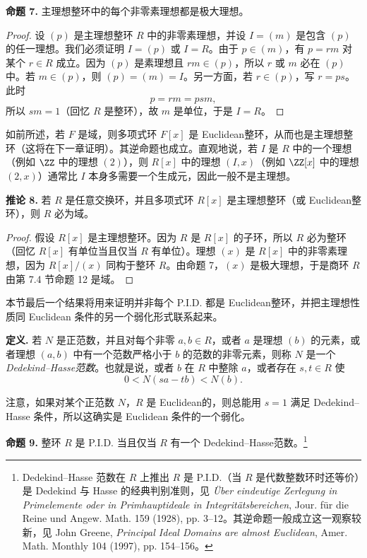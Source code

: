 \medskip
\noindent\textbf{命题 7.}
主理想整环中的每个非零素理想都是极大理想。

\begin{proof}
	设 $(p)$ 是主理想整环 $R$ 中的非零素理想，并设 $I=(m)$ 是包含 $(p)$ 的任一理想。我们必须证明 $I=(p)$ 或 $I=R$。由于 $p\in(m)$，有 $p=rm$ 对某个 $r\in R$ 成立。因为 $(p)$ 是素理想且 $rm\in(p)$，所以 $r$ 或 $m$ 必在 $(p)$ 中。若 $m\in(p)$，则 $(p)=(m)=I$。另一方面，若 $r\in(p)$，写 $r=ps$。此时
	\[
	p=rm=psm,
	\]
	所以 $sm=1$（回忆 $R$ 是整环），故 $m$ 是单位，于是 $I=R$。
\end{proof}

如前所述，若 $F$ 是域，则多项式环 $F[x]$ 是 Euclidean整环，从而也是主理想整环（这将在下一章证明）。其逆命题也成立。直观地说，若 $I$ 是 $R$ 中的一个理想（例如 $\ZZ$ 中的理想 $(2)$），则 $R[x]$ 中的理想 $(I,x)$（例如 $\ZZ[x]$ 中的理想 $(2,x)$）通常比 $I$ 本身多需要一个生成元，因此一般不是主理想。

\medskip
\noindent\textbf{推论 8.}
若 $R$ 是任意交换环，并且多项式环 $R[x]$ 是主理想整环（或 Euclidean整环），则 $R$ 必为域。

\begin{proof}
	假设 $R[x]$ 是主理想整环。因为 $R$ 是 $R[x]$ 的子环，所以 $R$ 必为整环（回忆 $R[x]$ 有单位当且仅当 $R$ 有单位）。理想 $(x)$ 是 $R[x]$ 中的非零素理想，因为 $R[x]/(x)$ 同构于整环 $R$。由命题 7，$(x)$ 是极大理想，于是商环 $R$ 由第 7.4 节命题 12 是域。
\end{proof}

本节最后一个结果将用来证明并非每个 P.I.D. 都是 Euclidean整环，并把主理想性质同 Euclidean 条件的另一个弱化形式联系起来。

\medskip
\noindent\textbf{定义.}
若 $N$ 是正范数，并且对每个非零 $a,b\in R$，或者 $a$ 是理想 $(b)$ 的元素，或者理想 $(a,b)$ 中有一个范数严格小于 $b$ 的范数的非零元素，则称 $N$ 是一个 \emph{Dedekind--Hasse范数}。也就是说，或者 $b$ 在 $R$ 中整除 $a$，或者存在 $s,t\in R$ 使
\[
0<N(sa-tb)<N(b).
\]

注意，如果对某个正范数 $N$，$R$ 是 Euclidean的，则总能用 $s=1$ 满足 Dedekind--Hasse 条件，所以这确实是 Euclidean 条件的一个弱化。

\medskip
\noindent\textbf{命题 9.}
整环 $R$ 是 P.I.D. 当且仅当 $R$ 有一个 Dedekind--Hasse范数。\footnote{Dedekind--Hasse 范数在 $R$ 上推出 $R$ 是 P.I.D.（当 $R$ 是代数整数环时还等价）是 Dedekind 与 Hasse 的经典判别准则，见 \emph{\"Uber eindeutige Zerlegung in Primelemente oder in Primhauptideale in Integrit\"atsbereichen}, Jour. f\"ur die Reine und Angew. Math. 159 (1928), pp. 3--12。其逆命题一般成立这一观察较新，见 John Greene, \emph{Principal Ideal Domains are almost Euclidean}, Amer. Math. Monthly 104 (1997), pp. 154--156。}

